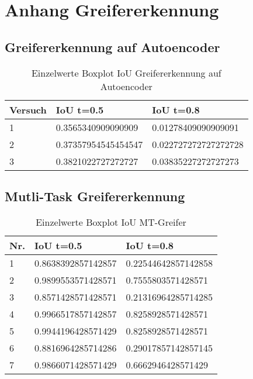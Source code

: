\chapter{Anhang  Greifererkennung}
\label{appendix:Greifererkennung}


	\section{Greifererkennung auf Autoencoder}
	\label{appendix:GreifererkennungAufAutoencoder}
	
		\begin{table}[ht]
		\centering
		\begin{tabularx}{\textwidth}{lll}
			\textbf{Versuch}  & \textbf{IoU t=0.5} & \textbf{IoU t=0.8}  	 \\ \hline 
			1 & 0.3565340909090909  & 0.01278409090909091 \\
			2 & 0.37357954545454547  & 0.022727272727272728  \\
			3 & 0.3821022727272727 & 0.03835227272727273 \\ 
		\end{tabularx}
		\caption{Einzelwerte Boxplot IoU Greifererkennung auf Autoencoder}
		\label{table:EinzelwerteBoxplotIoUGreifererkennungaufAutoencoder}
	\end{table}

	\section{Mutli-Task Greifererkennung}
	\label{appendix:MutliTaskGreifererkennung}
	
	\begin{table}[ht]
	\centering
	\begin{tabularx}{\textwidth}{lll}
		 \textbf{Nr.}  & \textbf{IoU t=0.5} & \textbf{IoU t=0.8}  	 \\ \hline 
		1 & 0.8638392857142857  & 0.22544642857142858 \\
		2 & 0.9899553571428571   & 0.7555803571428571 \\
		3 & 0.8571428571428571  & 0.21316964285714285 \\
		4 & 0.9966517857142857   & 0.8258928571428571 \\
		5 & 0.9944196428571429  & 0.8258928571428571  \\
		6 & 0.8816964285714286   & 0.29017857142857145 \\
		7 & 0.9866071428571429  & 0.6662946428571429 \\
	
	\end{tabularx}
	\caption{Einzelwerte Boxplot IoU MT-Greifer}
	\label{table:EinzelwerteBoxplotIoUMTGreifer}
\end{table}


